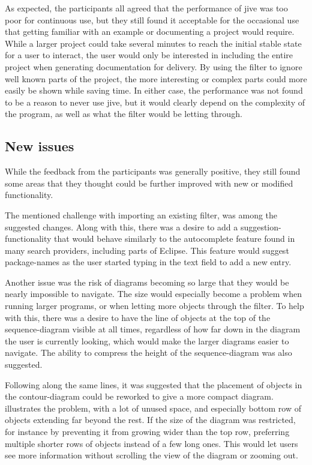As expected, the participants all agreed that the performance of \gls{jive} was too poor for continuous use, but they still found it acceptable for the occasional use that getting familiar with an example or documenting a project would require.
While a larger project could take several minutes to reach the initial stable state for a user to interact, the user would only be interested in including the entire project when generating documentation for delivery.
By using the filter to ignore well known parts of the project, the more interesting or complex parts could more easily be shown while saving time.
In either case, the performance was not found to be a reason to never use \gls{jive}, but it would clearly depend on the complexity of the program, as well as what the filter would be letting through.

\subsection{New issues}\label{jiveEvalIssues}
While the feedback from the participants was generally positive, they still found some areas that they thought could be further improved with new or modified functionality.

The mentioned challenge with importing an existing filter, was among the suggested changes.
Along with this, there was a desire to add a suggestion-functionality that would behave similarly to the autocomplete feature found in many search providers, including parts of Eclipse.
This feature would suggest package-names as the user started typing in the text field to add a new entry.

Another issue was the risk of diagrams becoming so large that they would be nearly impossible to navigate.
The size would especially become a problem when running larger programs, or when letting more objects through the filter.
To help with this, there was a desire to have the line of objects at the top of the sequence-diagram visible at all times, regardless of how far down in the diagram the user is currently looking, which would make the larger diagrams easier to navigate.
The ability to compress the height of the sequence-diagram was also suggested.

Following along the same lines, it was suggested that the placement of objects in the contour-diagram could be reworked to give a more compact diagram.
 illustrates the problem, with a lot of unused space, and especially bottom row of objects extending far beyond the rest.
If the size of the diagram was restricted, for instance by preventing it from growing wider than the top row, preferring multiple shorter rows of objects instead of a few long ones.
This would let users see more information without scrolling the view of the diagram or zooming out.

